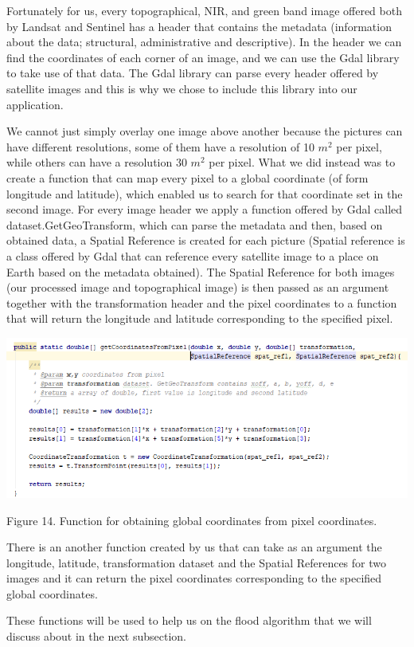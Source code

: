\documentclass[12pt, a4paper]{report}
\begin{document}
Fortunately for us, every topographical, NIR, and green band image offered both by Landsat and Sentinel has a header that contains the metadata (information about the data; structural, administrative and descriptive). In the header we can find the coordinates of each corner of an image, and we can use the Gdal library to take use of that data. The Gdal library can parse every header offered by satellite images and this is why we chose to include this library into our application. 
\par 

We cannot just simply overlay one image above another because the pictures can have different resolutions, some of them have a resolution of 10 $m^2$ per pixel, while others can have a resolution 30 $m^2$ per pixel. What we did instead was to create a function that can map every pixel to a global coordinate (of form longitude and latitude), which enabled us to search for that coordinate set in the second image. For every image header we apply a function offered by Gdal called dataset.GetGeoTransform, which can parse the metadata and then, based on obtained data, a Spatial Reference is created for each picture (Spatial reference is a class offered by Gdal that can reference every satellite image to a place on Earth based on the metadata obtained). The Spatial Reference for both images (our processed image and topographical image) is then passed as an argument together with the transformation header and the pixel coordinates to a function that will return the longitude and latitude corresponding to the specified pixel.

\bigskip
\includegraphics[scale=0.8, left]{java_coordinate_mapping.png}
\begin{center}
Figure 14. Function for obtaining global coordinates from pixel coordinates.
\end{center}
\par 

\quad
There is an another function created by us that can take as an argument the longitude, latitude, transformation dataset and the Spatial References for two images and it can return the pixel coordinates corresponding to the specified global coordinates.
\par 
These functions will be used to help us on the flood algorithm that we will discuss about in the next subsection.
\end{document}
